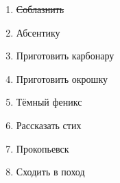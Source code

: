 \documentclass[12pt]{extarticle}
\author{Горбунов Роман, 307 группа}
\date{2018}
\title{}
\begin{document}
\begin{enumerate}
	\item \sout{Соблазнить}
	\item {Абсентику}
	\item {Приготовить карбонару}
	\item {Приготовить окрошку}
	\item {Тёмный феникс}
	\item {Рассказать стих}
	\item {Прокопьевск}
	\item {Сходить в поход}
\end{enumerate}
\end{document}
